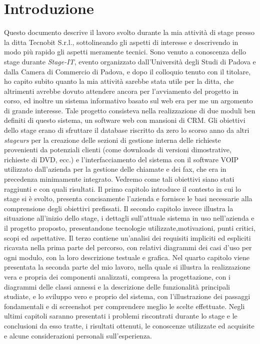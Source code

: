 \section{Introduzione}
Questo documento descrive il lavoro svolto durante la mia attivit\` a di stage presso la ditta Tecnobit S.r.l., sottolineando gli aspetti di interesse e descrivendo in modo pi\`u rapido gli aspetti meramente tecnici. 
Sono venuto a conoscenza dello stage durante \textit{Stage-IT}, evento organizzato dall'Universit\` a degli Studi di Padova e dalla Camera di Commercio di Padova, e dopo il colloquio tenuto con il titolare, ho capito subito quanto la mia attivit\` a sarebbe stata utile per la ditta, che altrimenti avrebbe dovuto attendere ancora per l'avviamento del progetto in corso, ed inoltre un sistema informativo basato sul web era per me un argomento di grande interesse. Tale progetto consisteva nella realizzazione di due moduli ben definiti di questo sistema, un software web con mansioni di CRM. Gli obiettivi dello stage erano di sfruttare il database riscritto da zero lo scorso anno da altri \textit{stageurs} per la creazione delle sezioni di gestione interna delle richieste provenienti da potenziali clienti (come downloads di versioni dimostrative, richieste di DVD, ecc.) e l'interfacciamento del sistema con il software VOIP utilizzato dall'azienda per la gestione delle chiamate e dei fax, che era in precedenza minimamente integrato. Vedremo come tali obiettivi siano stati raggiunti e con quali risultati. 
Il primo capitolo introduce il contesto in cui lo stage si \` e svolto, presenta concisamente l'azienda e fornisce le basi necessarie alla comprensione degli obiettivi prefissati. 
Il secondo capitolo invece illustra la situazione all'inizio dello stage, i dettagli sull'attuale sistema in uso nell'azienda e il progetto proposto, presentandone tecnologie utilizzate,motivazioni, punti critici, scopi ed aspettative.  
Il terzo contiene un'analisi dei requisiti impliciti ed espliciti ricavata nella prima parte del percorso, con relativi diagrammi dei casi d'uso per ogni modulo, con la loro descrizione testuale e grafica. 
Nel quarto capitolo viene presentata la seconda parte del mio lavoro, nella quale si illustra la realizzazione vera e propria dei componenti analizzati, compresa la progettazione, con i diagrammi delle classi annessi e la descrizione delle funzionalit\`a principali studiate, e lo sviluppo vero e proprio del sistema, con l'illustrazione dei passaggi fondamentali e di screenshot per comprendere meglio le scelte effettuate. 
Negli ultimi capitoli saranno presentati i problemi riscontrati durante lo stage e le conclusioni da esso tratte, i risultati ottenuti, le conoscenze utilizzate ed acquisite e alcune considerazioni personali sull'esperienza.

